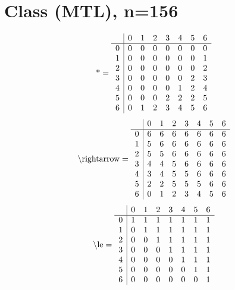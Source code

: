 \documentclass[11pt]{article}
\begin{document}
\section{Class (MTL), n=156}
\[\text{*} = 
\begin{array}{r | r r r r r r r}
 & 0 & 1 & 2 & 3 & 4 & 5 & 6 \\ \hline
0 & 0 & 0 & 0 & 0 & 0 & 0 & 0 \\
1 & 0 & 0 & 0 & 0 & 0 & 0 & 1 \\
2 & 0 & 0 & 0 & 0 & 0 & 0 & 2 \\
3 & 0 & 0 & 0 & 0 & 0 & 2 & 3 \\
4 & 0 & 0 & 0 & 0 & 1 & 2 & 4 \\
5 & 0 & 0 & 0 & 2 & 2 & 2 & 5 \\
6 & 0 & 1 & 2 & 3 & 4 & 5 & 6 \\
\end{array}
\]
\[\text{\textbackslash rightarrow} = 
\begin{array}{r | r r r r r r r}
 & 0 & 1 & 2 & 3 & 4 & 5 & 6 \\ \hline
0 & 6 & 6 & 6 & 6 & 6 & 6 & 6 \\
1 & 5 & 6 & 6 & 6 & 6 & 6 & 6 \\
2 & 5 & 5 & 6 & 6 & 6 & 6 & 6 \\
3 & 4 & 4 & 5 & 6 & 6 & 6 & 6 \\
4 & 3 & 4 & 5 & 5 & 6 & 6 & 6 \\
5 & 2 & 2 & 5 & 5 & 5 & 6 & 6 \\
6 & 0 & 1 & 2 & 3 & 4 & 5 & 6 \\
\end{array}
\]
\[\text{\textbackslash le} = 
\begin{array}{r | r r r r r r r}
 & 0 & 1 & 2 & 3 & 4 & 5 & 6 \\ \hline
0 & 1 & 1 & 1 & 1 & 1 & 1 & 1 \\
1 & 0 & 1 & 1 & 1 & 1 & 1 & 1 \\
2 & 0 & 0 & 1 & 1 & 1 & 1 & 1 \\
3 & 0 & 0 & 0 & 1 & 1 & 1 & 1 \\
4 & 0 & 0 & 0 & 0 & 1 & 1 & 1 \\
5 & 0 & 0 & 0 & 0 & 0 & 1 & 1 \\
6 & 0 & 0 & 0 & 0 & 0 & 0 & 1 \\
\end{array}
\]
\end{document}
